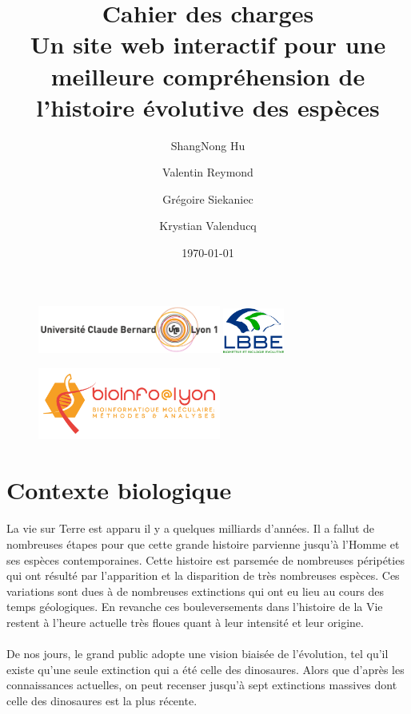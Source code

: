 \documentclass[a4paper]{article}
\title{{\sc \large Cahier des charges}\\
\bf Un site web interactif pour une meilleure compréhension de l’histoire évolutive des espèces}
\author{ShangNong {\sc Hu}\and Valentin {\sc Reymond}\and Grégoire {\sc Siekaniec}\and Krystian {\sc Valenducq}}
\date\today
\begin{document}
\begin{figure}[!t]
	\centering
	\includegraphics[width=6cm]{ucbl.png}
	\hspace{\fill}
	\includegraphics[width=2cm]{lbbe.png}
\end{figure}

\maketitle
\thispagestyle{empty}

\begin{figure}[!b]
	\centering
	\includegraphics[width=6cm]{logo.png}
\end{figure}

\newpage

\tableofcontents
\newpage


\section{Contexte biologique}
	\paragraph{}
	La vie sur Terre est apparu il y a quelques milliards d'années. Il a fallut de nombreuses étapes pour que cette grande histoire parvienne jusqu'à l'Homme et ses espèces contemporaines. Cette histoire est parsemée de nombreuses péripéties qui ont résulté par l'apparition et la disparition de très nombreuses espèces. Ces variations sont dues à de nombreuses extinctions qui ont eu lieu au cours des temps géologiques. En revanche ces bouleversements dans l'histoire de la Vie restent à l'heure actuelle très floues quant à leur intensité et leur origine.

	\paragraph{}
	De nos jours, le grand public adopte une vision biaisée de l'évolution, tel qu'il existe qu'une seule extinction qui a été celle des dinosaures. Alors que d'après les connaissances actuelles, on peut recenser jusqu'à sept extinctions massives dont celle des dinosaures est la plus récente.
\end{document}
